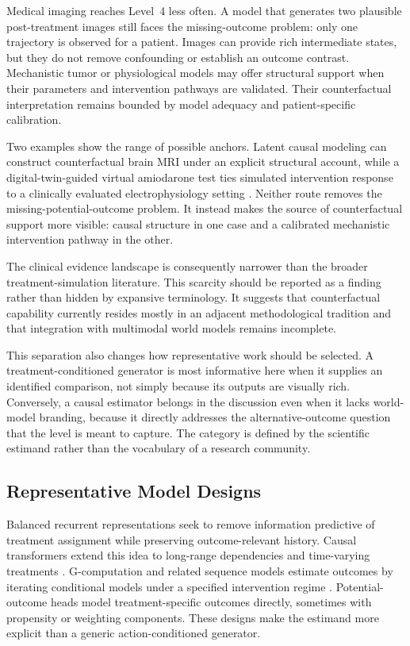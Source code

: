 Medical imaging reaches Level~4 less often. A model that generates two plausible post-treatment images still faces the missing-outcome problem: only one trajectory is observed for a patient. Images can provide rich intermediate states, but they do not remove confounding or establish an outcome contrast. Mechanistic tumor or physiological models may offer structural support when their parameters and intervention pathways are validated. Their counterfactual interpretation remains bounded by model adequacy and patient-specific calibration.

Two examples show the range of possible anchors. Latent causal modeling can construct counterfactual brain MRI under an explicit structural account, while a digital-twin-guided virtual amiodarone test ties simulated intervention response to a clinically evaluated electrophysiology setting \citep{Peng2024LatentCausalModeling,Hwang2024ClinicalUsefulnessDigital}. Neither route removes the missing-potential-outcome problem. It instead makes the source of counterfactual support more visible: causal structure in one case and a calibrated mechanistic intervention pathway in the other.

The clinical evidence landscape is consequently narrower than the broader treatment-simulation literature. This scarcity should be reported as a finding rather than hidden by expansive terminology. It suggests that counterfactual capability currently resides mostly in an adjacent methodological tradition and that integration with multimodal world models remains incomplete.

This separation also changes how representative work should be selected. A treatment-conditioned generator is most informative here when it supplies an identified comparison, not simply because its outputs are visually rich. Conversely, a causal estimator belongs in the discussion even when it lacks world-model branding, because it directly addresses the alternative-outcome question that the level is meant to capture. The category is defined by the scientific estimand rather than the vocabulary of a research community.

\subsection{Representative Model Designs}

Balanced recurrent representations seek to remove information predictive of treatment assignment while preserving outcome-relevant history. Causal transformers extend this idea to long-range dependencies and time-varying treatments \citep{Bica2020CRN,Melnychuk2022CausalTransformer}. G-computation and related sequence models estimate outcomes by iterating conditional models under a specified intervention regime \citep{Li2020GNet}. Potential-outcome heads model treatment-specific outcomes directly, sometimes with propensity or weighting components. These designs make the estimand more explicit than a generic action-conditioned generator.

